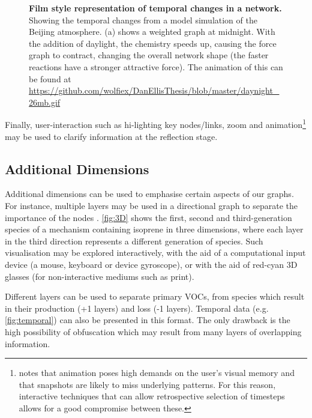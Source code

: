 \begin{figure}[H]
\begin{subfigure}[b]{.49\textwidth}
    \caption{}
    \end{subfigure}
       \caption{\textbf{Film style representation of temporal changes in a network.} Showing the temporal changes from a model simulation of the Beijing atmosphere. (a) shows a weighted graph at midnight. With the addition of daylight, the chemistry speeds up, causing the force graph to contract, changing the overall network shape (the faster reactions have a stronger attractive force). The animation of this can be found at \url{https://github.com/wolfiex/DanEllisThesis/blob/master/daynight_26mb.gif}}
     \label{fig:temporal}
\end{figure}


Finally, user-interaction such as hi-lighting key nodes/links, zoom and animation\footnote{\citep{ch8} notes that animation poses high demands on the user's visual memory and that snapshots are likely to miss underlying patterns.  For this reason, interactive techniques that can allow retrospective selection of timesteps allows for a good compromise between these.} may be used to clarify information at the reflection stage.

\subsection{Additional Dimensions}
Additional dimensions can be used to emphasise certain aspects of our graphs. For instance, multiple layers may be used in a directional graph to separate the importance of the nodes \citep{IPSEPCOLA}. \autoref{fig:3D} shows the first, second and third-generation species of a mechanism containing isoprene in three dimensions, where each layer in the third direction represents a different generation of species. Such visualisation may be explored interactively, with the aid of a computational input device (a mouse, keyboard or device gyroscope), or with the aid of red-cyan 3D glasses (for non-interactive mediums such as print).

 Different layers can be used to separate primary VOCs, from species which result in their production (+1 layers) and loss (-1 layers).
 Temporal data (e.g. \autoref{fig:temporal}) can also be presented in this format. The only drawback is the high possibility of obfuscation which may result from many layers of overlapping information.



